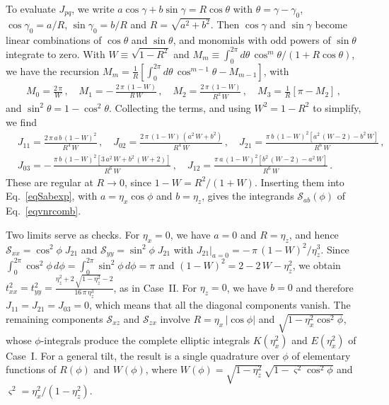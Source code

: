 \documentclass[aps,prb,onecolumn,nofootinbib,citeautoscript,10pt]{revtex4-2}
\def \nn{\nonumber \\}
\begin{document}
To evaluate $J_{pq}$, we write $a\cos\gamma+b\sin\gamma=R\cos\theta$ with $\theta=\gamma-\gamma_0$, $\cos\gamma_0=a/R$, $\sin\gamma_0=b/R$ and $R=\sqrt{a^2+b^2}$. Then $\cos\gamma$ and $\sin\gamma$ become linear combinations of $\cos\theta$ and $\sin\theta$, and monomials with odd powers of $\sin\theta$ integrate to zero. With $W\equiv\sqrt{1-R^2}$ and $M_m\equiv\int_0^{2\pi}d\theta\,\cos^m\theta/(1+R\cos\theta)$, we have the recursion $M_m=\frac1R\left[\int_0^{2\pi}d\theta\,\cos^{m-1}\theta-M_{m-1}\right]$, with
\begin{align}
M_0=\frac{2\,\pi}{W}\,, \quad M_1=-\,\frac{2\,\pi\,(1-W)}{R\,W}\,, \quad M_2=\frac{2\,\pi\,(1-W)}{R^2\,W}\,, \quad M_3=\frac{1}{R}\left[\pi-M_2\right]\,,
\end{align}
and $\sin^2\theta=1-\cos^2\theta$. Collecting the terms, and using $W^2=1-R^2$ to simplify, we find
\begin{align}
\label{eqJpq}
& J_{11} = \frac{2\,\pi\,a\,b\,(1-W)^2}{R^4\,W} \,, \quad
J_{02} = \frac{2\,\pi\,(1-W)\,(a^2\,W+b^2)}{R^4\,W} \,, \quad
J_{21} = \frac{\pi\,b\,(1-W)^2 \left[ a^2\,(W-2)-b^2\,W \right]}{R^6\,W} \,, \nn &
J_{03} = -\,\frac{\pi\,b\,(1-W)^2 \left[ 3\,a^2\,W+b^2\,(W+2) \right]}{R^6\,W} \,, \quad
J_{12} = \frac{\pi\,a\,(1-W)^2 \left[ b^2\,(W-2)-a^2\,W \right]}{R^6\,W}\,.
\end{align}
These are regular at $R\to0$, since $1-W=R^2/(1+W)$. Inserting them into Eq.~\eqref{eqSabexp}, with $a=\eta_x\cos\phi$ and $b=\eta_z$, gives the integrands $\mathscr S_{ab}(\phi)$ of Eq.~\eqref{eqvnrcomb}.

Two limits serve as checks. For $\eta_x=0$, we have $a=0$ and $R=\eta_z$, and hence $\mathscr S_{xx}=\cos^2\phi\;J_{21}$ and $\mathscr S_{yy}=\sin^2\phi\;J_{21}$ with $J_{21}\big|_{a=0}=-\,\pi\,(1-W)^2/\eta_z^3$. Since $\int_0^{2\pi}\cos^2\phi\,d\phi=\int_0^{2\pi}\sin^2\phi\,d\phi=\pi$ and $(1-W)^2=2-2\,W-\eta_z^2$, we obtain $t^2_{xx}=t^2_{yy}=\frac{\eta_z^2+2\,\sqrt{1-\eta_z^2}-2}{16\,\pi\,\eta_z^3}$, as in Case~II. For $\eta_z=0$, we have $b=0$ and therefore $J_{11}=J_{21}=J_{03}=0$, which means that all the diagonal components vanish. The remaining components $\mathscr S_{xz}$ and $\mathscr S_{zx}$ involve $R=\eta_x\,|\cos\phi|$ and $\sqrt{1-\eta_x^2\cos^2\phi}$, whose $\phi$-integrals produce the complete elliptic integrals $K(\eta_x^2)$ and $E(\eta_x^2)$ of Case~I. For a general tilt, the result is a single quadrature over $\phi$ of elementary functions of $R(\phi)$ and $W(\phi)$, where $W(\phi)=\sqrt{1-\eta_z^2}\,\sqrt{1-\varsigma^2\cos^2\phi}$ and $\varsigma^2=\eta_x^2/(1-\eta_z^2)$.
\end{document}
